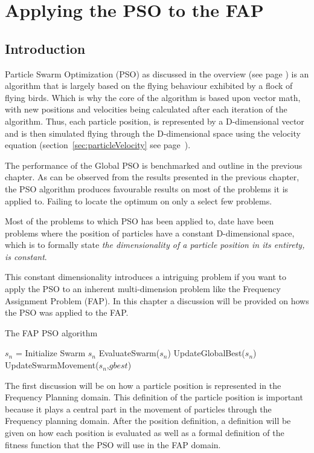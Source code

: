 \chapter{Applying the PSO to the FAP}
\label{chpt:psoapplicationFAP}
\section{Introduction}
Particle Swarm Optimization (PSO) as discussed in the overview (see page \pageref{sec:PSO}) is an algorithm that is largely based on the flying behaviour exhibited by a flock of flying birds. Which is why the core of the algorithm is based upon vector math, with new positions and velocities being calculated after each iteration of the algorithm. Thus, each particle position, is represented by a D-dimensional vector and is then simulated flying through the D-dimensional space using the velocity equation (section~\ref{sec:particleVelocity} see page~\pageref{eq:velocityupdate}).

The performance of the Global PSO is benchmarked and outline in the previous chapter. As can be observed from the results presented in the previous chapter, the PSO algorithm produces favourable results on most of the problems it is applied to. Failing to locate the optimum on only a select few problems. 

Most of the problems to which PSO has been applied to, date have been problems where the position of particles have a constant D-dimensional space, which is to formally state \emph{the dimensionality of a particle position in its entirety, is constant}.

This constant dimensionality introduces a intriguing problem if you want to apply the PSO to an inherent multi-dimension problem like the Frequency Assignment Problem (FAP). In this chapter a discussion will be provided on hows the PSO was applied to the FAP.

\begin{algorithm}
\label{alg:FAPPSO}
\caption{The FAP PSO algorithm}
\begin{algorithmic}
\STATE $s_n$ = Initialize Swarm $s_n$
	\STATE EvaluateSwarm($s_n$)
	\STATE UpdateGlobalBest($s_n$)
	\STATE UpdateSwarmMovement($s_n$,$gbest$)
\ENDWHILE
\end{algorithmic}
\end{algorithm}

The first discussion will be on how a particle position is represented in the Frequency Planning domain. This definition of the particle position is important because it plays a central part in
the movement of particles through the Frequency planning domain. After the position definition, a definition will be given on how each position is evaluated as well as a formal definition of the fitness function that the PSO will use in the FAP domain.

